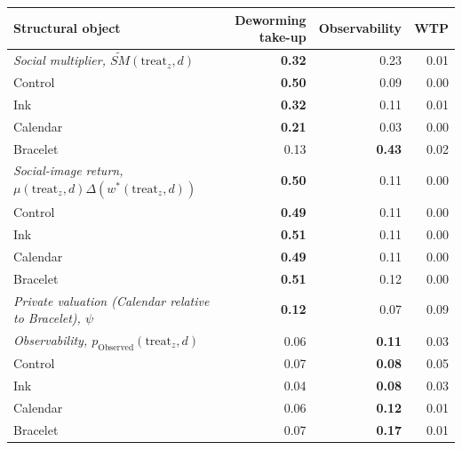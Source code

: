 
\begin{tabular}[t]{>{\raggedright\arraybackslash}p{5.4cm}rrr}
\toprule
Structural object & Deworming take-up & Observability & WTP\\
\midrule
\em{Social multiplier, $\tilde{SM}(\textrm{treat}_z,d)$} & \textbf{0.32} & 0.23 & 0.01\\
\hspace{1em}Control & \textbf{0.50} & 0.09 & 0.00\\
\hspace{1em}Ink & \textbf{0.32} & 0.11 & 0.01\\
\hspace{1em}Calendar & \textbf{0.21} & 0.03 & 0.00\\
\hspace{1em}Bracelet & 0.13 & \textbf{0.43} & 0.02\\
\midrule
\em{Social-image return, $\mu(\textrm{treat}_z,d)\Delta(w^\ast(\textrm{treat}_z,d))$} & \textbf{0.50} & 0.11 & 0.00\\
\hspace{1em}Control & \textbf{0.49} & 0.11 & 0.00\\
\hspace{1em}Ink & \textbf{0.51} & 0.11 & 0.00\\
\hspace{1em}Calendar & \textbf{0.49} & 0.11 & 0.00\\
\hspace{1em}Bracelet & \textbf{0.51} & 0.12 & 0.00\\
\midrule
\em{Private valuation (Calendar relative to Bracelet), $\psi$} & \textbf{0.12} & 0.07 & 0.09\\
\midrule
\em{Observability, $p_{\textrm{Observed}}(\textrm{treat}_z,d)$} & 0.06 & \textbf{0.11} & 0.03\\
\hspace{1em}Control & 0.07 & \textbf{0.08} & 0.05\\
\hspace{1em}Ink & 0.04 & \textbf{0.08} & 0.03\\
\hspace{1em}Calendar & 0.06 & \textbf{0.12} & 0.01\\
\hspace{1em}Bracelet & 0.07 & \textbf{0.17} & 0.01\\
\bottomrule
\end{tabular}
